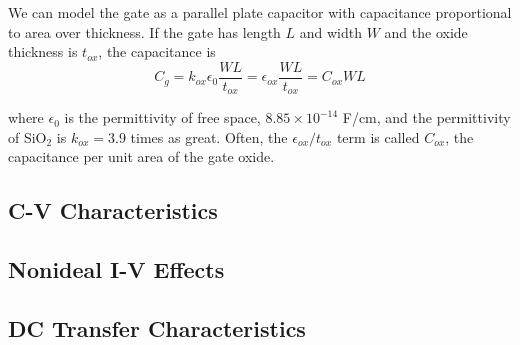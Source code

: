 We can model the gate as a parallel plate capacitor with capacitance proportional to area over thickness. If the gate has length $L$ and width $W$ and the 
oxide thickness is $t_{ox}$, the capacitance is 
\begin{equation}
    C_g = k_{ox} \epsilon_{0} \frac{WL}{t_{ox}} = \epsilon_{ox} \frac{WL}{t_{ox}} = C_{ox} WL
\end{equation}

where $\epsilon_{0}$ is the permittivity of free space, $8.85 \times 10^{-14}$ F/cm, and the permittivity of SiO$_2$ is $k_{ox} = 3.9$ times as great. Often, the 
$\epsilon_{ox}/t_{ox}$ term is called $C_{ox}$, the capacitance per unit area of the gate oxide.

\subsection{C-V Characteristics}

\subsection{Nonideal I-V Effects}

\subsection{DC Transfer Characteristics}
